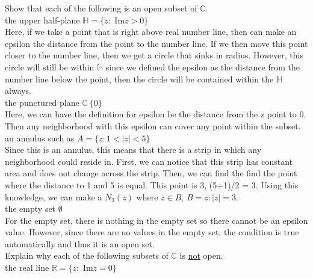 \documentclass[12pt]{article}
\begin{document}
 Show that each of the following is an open subset of $\mathbb{C}$.\\


 the upper half-plane $\mathbb{H} = \{z : $ Im$ z > 0\}$ \\

Here, if we take a point that is right above real number line, then can make an epsilon the distance from the point to the number line. 
If we then move this point closer to the number line, then we get a circle that sinks in radius. 
However, this circle will still be within $\mathbb{H}$ since we defined the epsilon as the distance from the number line below the point, then the circle will be contained within the $\mathbb{H}$ always.\\

 the punctured plane $\mathbb{C} \ \{0\}$\\

Here, we can have the definition for epsilon be the distance from the z point to 0. 
Then any neighborhood with this epsilon can cover any point within the subset.\\

 an annulus such as $A = \{ z : 1 < |z| < 5 \}$ \\

Since this is an annulus, this means that there is a strip in which any neighborhood could reside in.
First, we can notice that this strip has constant area and does not change across the strip. 
Then, we can find the find the point where the distance to 1 and 5 is equal. 
This point is 3, (5+1)/2 = 3.
Using this knowledge, we can make a $N_{3}(z)$ where $z \in B$, $B = {z : |z| = 3}$.\\


 the empty set $\emptyset$ \\

For the empty set, there is nothing in the empty set so there cannot be an epsilon value.
However, since there are no values in the empty set, the condition is true automatically and thus it is an open set.\\


 Explain why each of the following subsets of $\mathbb{C}$ is \underline{not} open.\\


 the real line $\mathbb{R} = \{ z:$ Im$ z = 0\}$ \\
\end{document}
